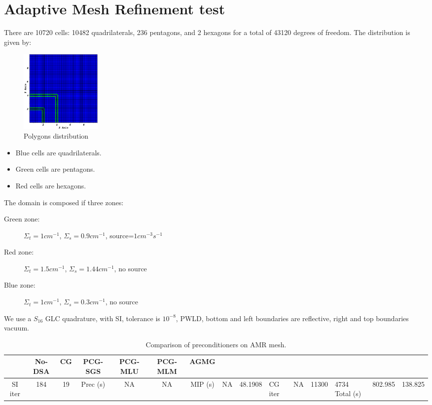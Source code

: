 \section{Adaptive Mesh Refinement test}
There are 10720 cells: 10482 quadrilaterals, 236 pentagons, and 2 hexagons 
for a total of 43120 degrees of freedom. The distribution is given by:
\begin{figure}[H]
  \centering
  \includegraphics[width=4cm]{polygon_amr}
  \caption{Polygons distribution}
\end{figure}
\begin{itemize}
  \item Blue cells are quadrilaterals.
  \item Green cells are pentagons.
  \item Red cells are hexagons.
\end{itemize}
The domain is composed if three zones:
\begin{description}
  \item[Green zone:] $\Sigma_t=1cm^{-1}$, $\Sigma_s=0.9cm^{-1}$,
    source=$1cm^{-3}s^{-1}$
  \item[Red zone:] $\Sigma_t=1.5cm^{-1}$, $\Sigma_s=1.44cm^{-1}$, no source
  \item[Blue zone:] $\Sigma_t=1cm^{-1}$, $\Sigma_s=0.3cm^{-1}$, no source
\end{description}
We use a $S_{16}$ GLC quadrature, with SI, tolerance is $10^{-8}$, PWLD,
bottom and left boundaries are reflective, right and top boundaries vacuum.
\begin{table}[H]
  \caption{Comparison of preconditioners on AMR mesh.}
  \begin{centering}
    \begin{tabular}{|c|c|c|c|c|c|c|}
      \hline
       & No-DSA & CG & PCG-SGS & PCG-MLU & PCG-MLM & AGMG \\
      \hline
      SI iter    & 184     & 19      &
      Prec (s)   & NA      & NA      &
      MIP (s)    & NA      & 48.1908 &
      CG iter    & NA      & 11300   & 4734
      Total (s)  & 802.985 & 138.825 &
    \end{tabular}
  \end{centering}
\end{table}

